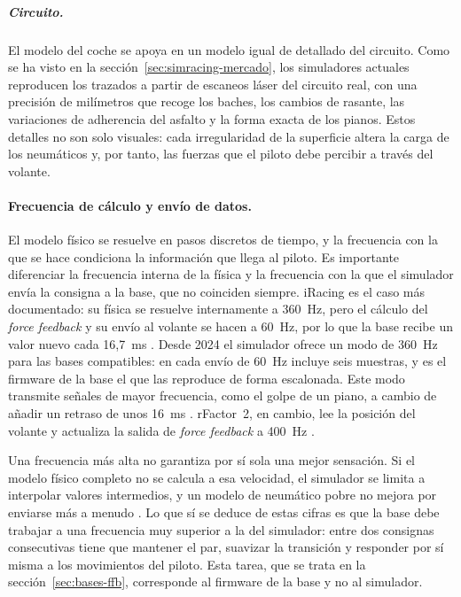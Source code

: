 \subparagraph{Circuito.}
El modelo del coche se apoya en un modelo igual de detallado del circuito. Como se ha visto en la sección~\ref{sec:simracing-mercado}, los simuladores actuales reproducen los trazados a partir de escaneos láser del circuito real, con una precisión de milímetros que recoge los baches, los cambios de rasante, las variaciones de adherencia del asfalto y la forma exacta de los pianos. Estos detalles no son solo visuales: cada irregularidad de la superficie altera la carga de los neumáticos y, por tanto, las fuerzas que el piloto debe percibir a través del volante.

\paragraph{Frecuencia de cálculo y envío de datos.}
El modelo físico se resuelve en pasos discretos de tiempo, y la frecuencia con la que se hace condiciona la información que llega al piloto. Es importante diferenciar la frecuencia interna de la física y la frecuencia con la que el simulador envía la consigna a la base, que no coinciden siempre. iRacing es el caso más documentado: su física se resuelve internamente a 360~Hz, pero el cálculo del \textit{force feedback} y su envío al volante se hacen a 60~Hz, por lo que la base recibe un valor nuevo cada 16,7~ms \parencite{iracing_360hz}. Desde 2024 el simulador ofrece un modo de 360~Hz para las bases compatibles: en cada envío de 60~Hz incluye seis muestras, y es el firmware de la base el que las reproduce de forma escalonada. Este modo transmite señales de mayor frecuencia, como el golpe de un piano, a cambio de añadir un retraso de unos 16~ms \parencite{iracing_360hz}. rFactor~2, en cambio, lee la posición del volante y actualiza la salida de \textit{force feedback} a 400~Hz \parencite{overtake_ffb_analysis}.

Una frecuencia más alta no garantiza por sí sola una mejor sensación. Si el modelo físico completo no se calcula a esa velocidad, el simulador se limita a interpolar valores intermedios, y un modelo de neumático pobre no mejora por enviarse más a menudo \parencite{simxperience_ffb_myths}. Lo que sí se deduce de estas cifras es que la base debe trabajar a una frecuencia muy superior a la del simulador: entre dos consignas consecutivas tiene que mantener el par, suavizar la transición y responder por sí misma a los movimientos del piloto. Esta tarea, que se trata en la sección~\ref{sec:bases-ffb}, corresponde al firmware de la base y no al simulador.

